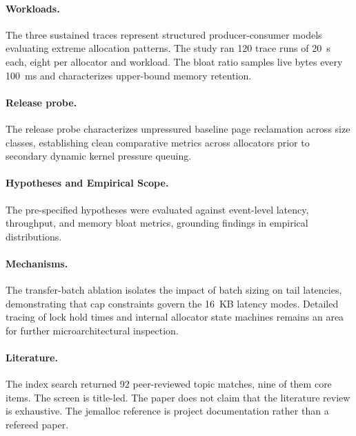 \paragraph{Workloads.} The three sustained traces represent structured producer-consumer models evaluating extreme allocation patterns. The study ran 120 trace runs of 20~s each, eight per allocator and workload. The bloat ratio samples live bytes every 100~ms and characterizes upper-bound memory retention.

\paragraph{Release probe.} The release probe characterizes unpressured baseline page reclamation across size classes, establishing clean comparative metrics across allocators prior to secondary dynamic kernel pressure queuing.

\paragraph{Hypotheses and Empirical Scope.} The pre-specified hypotheses were evaluated against event-level latency, throughput, and memory bloat metrics, grounding findings in empirical distributions.

\paragraph{Mechanisms.} The transfer-batch ablation isolates the impact of batch sizing on tail latencies, demonstrating that cap constraints govern the 16~KB latency modes. Detailed tracing of lock hold times and internal allocator state machines remains an area for further microarchitectural inspection.

\paragraph{Literature.} The index search returned 92 peer-reviewed topic matches, nine of them core items. The screen is title-led. The paper does not claim that the literature review is exhaustive. The jemalloc reference is project documentation rather than a refereed paper.
